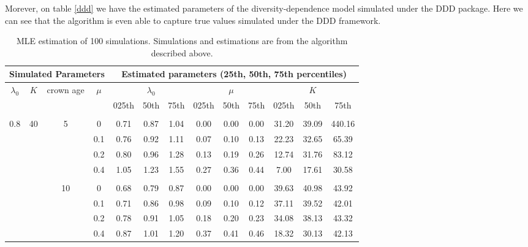 \documentclass[]{article}
\begin{document}
Morever, on table \ref{ddd} we have the estimated parameters of the diversity-dependence model simulated under the DDD package. Here we can see that the algorithm is even able to capture true values simulated under the DDD framework. 

\begin{table}[h!]
\centering

\caption{MLE estimation of 100 simulations. Simulations and estimations are from the algorithm described above.}
\label{alg}
\begin{tabular}{cccc|ccc@{\hskip 0.3in}ccc@{\hskip 0.3in}ccc}
\hline
\multicolumn{4}{c}{Simulated Parameters} & \multicolumn{9}{c}{Estimated parameters (25th, 50th, 75th percentiles)} \\ \hline
$\lambda_0$    & $K$     & crown age    & $\mu$    &        & $\lambda_0$  &       &       & $\mu$   &      &       & $K$     &        \\
          &       &              &       & 025th  & 50th    & 75th  & 025th & 50th & 75th & 025th & 50th  & 75th   \\
          &       &              &       &        &         &       &       &      &      &       &       &        \\
0.8       & 40    & 5            & 0     & 0.71   & 0.87    & 1.04  & 0.00  & 0.00 & 0.00 & 31.20 & 39.09 & 440.16 \\
          &       &              & 0.1   & 0.76   & 0.92    & 1.11  & 0.07  & 0.10 & 0.13 & 22.23 & 32.65 & 65.39  \\
          &       &              & 0.2   & 0.80   & 0.96    & 1.28  & 0.13  & 0.19 & 0.26 & 12.74 & 31.76 & 83.12  \\
          &       &              & 0.4   & 1.05   & 1.23    & 1.55  & 0.27  & 0.36 & 0.44 & 7.00  & 17.61 & 30.58  \\
          &       &              &       &        &         &       &       &      &      &       &       &        \\
          &       & 10           & 0     & 0.68   & 0.79    & 0.87  & 0.00  & 0.00 & 0.00 & 39.63 & 40.98 & 43.92  \\
          &       &              & 0.1   & 0.71   & 0.86    & 0.98  & 0.09  & 0.10 & 0.12 & 37.11 & 39.52 & 42.01  \\
          &       &              & 0.2   & 0.78   & 0.91    & 1.05  & 0.18  & 0.20 & 0.23 & 34.08 & 38.13 & 43.32  \\
          &       &              & 0.4   & 0.87   & 1.01    & 1.20  & 0.37  & 0.41 & 0.46 & 18.32 & 30.13 & 42.13  \\

\end{tabular}
\end{table}
\end{document}
